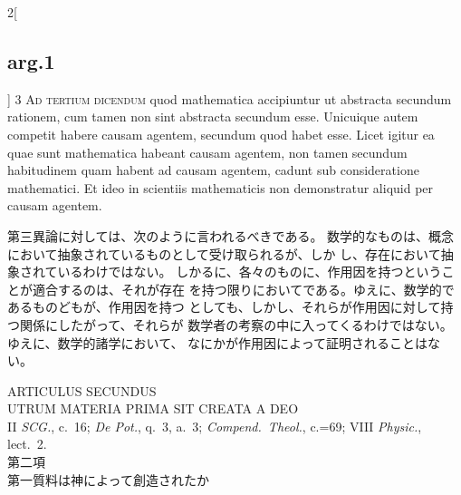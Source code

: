 \documentclass[paper=a4paper,fontsize=10pt,jafontsize=9pt,titlepage]{jlreq}
\begin{document}
\begin{paracol}{2}[\subsection{arg.1}]
3 {\scshape Ad tertium dicendum} quod mathematica accipiuntur ut abstracta
 secundum rationem, cum tamen non sint abstracta secundum
 esse. Unicuique autem competit habere causam agentem, secundum quod
 habet esse. Licet igitur ea quae sunt mathematica habeant causam
 agentem, non tamen secundum habitudinem quam habent ad causam agentem,
 cadunt sub consideratione mathematici. Et ideo in scientiis
 mathematicis non demonstratur aliquid per causam agentem.

\switchcolumn

第三異論に対しては、次のように言われるべきである。
数学的なものは、概念において抽象されているものとして受け取られるが、しか
 し、存在において抽象されているわけではない。
しかるに、各々のものに、作用因を持つということが適合するのは、それが存在
 を持つ限りにおいてである。ゆえに、数学的であるものどもが、作用因を持つ
 としても、しかし、それらが作用因に対して持つ関係にしたがって、それらが
 数学者の考察の中に入ってくるわけではない。ゆえに、数学的諸学において、
 なにかが作用因によって証明されることはない。

\end{paracol}

\newpage
{}
{}
\setcounter{section}{2}
\setcounter{subsection}{0}


\begin{center}
{\Large ARTICULUS SECUNDUS}\\
{\large UTRUM MATERIA PRIMA SIT CREATA A DEO}\\
{\footnotesize II {\itshape SCG.}, c.~16; {\itshape De Pot.}, q.~3,
 a.~3; {\itshape Compend.~Theol.}, c.=69; VIII {\itshape Physic.}, lect.~2.}\\
{\large 第二項\\第一質料は神によって創造されたか}
 
\end{center}
\end{document}
